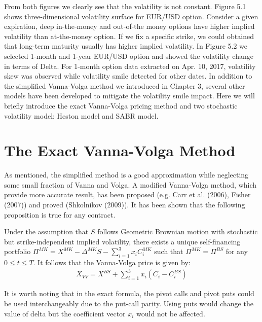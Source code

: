 \noindent
From both figures we clearly see that the volatility is not constant. Figure 5.1 shows three-dimensional volatility surface for EUR/USD option. Consider a given expiration, deep in-the-money and out-of-the money options have higher implied volatility than at-the-money option. If we fix a specific strike, we could obtained that long-term maturity usually has higher implied volatility.\newline\newline
In Figure 5.2 we selected 1-month and 1-year EUR/USD option and showed the volatility change in terms of Delta. For 1-month option  data extracted on Apr. 10, 2017, volatility skew was observed while volatility smile detected for other dates.
\newline\newline
In addition to the simplified Vanna-Volga method we introduced in Chapter 3, several other models have been developed to mitigate the volatility smile impact. Here we will briefly introduce the exact Vanna-Volga pricing method and two stochastic volatility model: Heston model and SABR model.

\section{The Exact Vanna-Volga Method}
As mentioned, the simplified method is a good approximation while neglecting some small fraction of Vanna and Volga. A modified Vanna-Volga method, which provide more accurate result, has been proposed (e.g. Carr et al. (2006), Fisher (2007)) and proved (Shkolnikov (2009)). It has been shown that the following proposition is true for any contract.
\begin{prop}
	Under the assumption that $S$ follows Geometric Brownian motion with stochastic but strike-independent implied volatility, there exists a unique self-financing portfolio $\Pi^{MK} = X^{MK}-\Delta^{MK} S-\sum_{i=1}^{3}x_i C_i^{MK}$ such that $\Pi^{MK} = \Pi^{BS}$ for any $0 \leq t \leq T$. It follows that the Vanna-Volga price is given by:
	\begin{align}
	X_{VV} = X^{BS}+\sum_{i=1}^{3}x_i\left( C_i - C_{i}^{BS}\right) 
	\end{align}
\end{prop}
It is worth noting that in the exact formula, the pivot calls and pivot puts could be used interchangeably due to the put-call parity. Using puts would change the value of delta but the coefficient vector $x_i$ would not be affected. \newline


